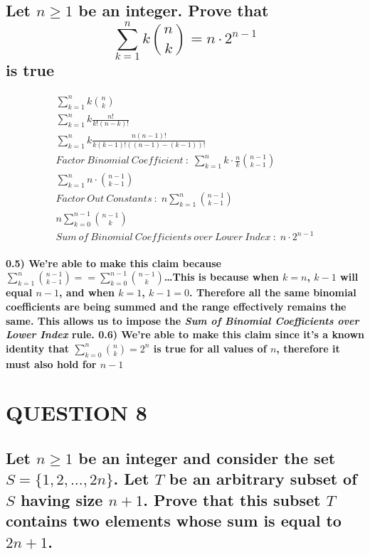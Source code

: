 \documentclass{amsart}
\theoremstyle{definition}
\theoremstyle{remark}
\numberwithin{equation}{section}
\begin{document}
\subsection*{
Let $n \geq 1$ be an integer. Prove that 
\[ \sum_{k=1}^n k {n \choose k} = n \cdot 2^{n-1} \] is true
}
\begin{align}
	\sum_{k=1}^n k {n \choose k} \\
	\sum_{k=1}^n k\frac{n!}{k!(n-k)!} \\
	\sum_{k=1}^n k \frac{n(n-1)!}{k(k-1)!( (n-1) - (k-1) )!} \\
	Factor\:Binomial\:Coefficient\: :\; \sum_{k=1}^n k\cdot \frac{n}{k}{n-1 \choose k-1} \\
	\sum_{k=1}^n n\cdot {n-1 \choose k-1} \\
	Factor\:Out\:Constants\: :\; n \sum_{k=1}^n {n-1 \choose k-1} \\
	n \sum_{k=0}^{n-1} {n-1 \choose k} \\
	Sum\:of\:Binomial\:Coefficients\:over\:Lower\:Index\: :\;n\cdot 2^{n-1}
\end{align}
\paragraph{
	\textbf{0.5)} We're able to make this claim because $\sum_{k=1}^n {n-1 \choose k-1} == \sum_{k=0}^{n-1} {n-1 \choose k}$\dots\newline This is because when $k=n$, $k-1$ will equal $n-1$, and when $k=1$, $k-1 = 0$. Therefore all the same binomial coefficients are being summed and the range effectively remains the same. This allows us to impose the \textit{Sum of Binomial Coefficients over Lower Index} rule.\newline\newline
	\textbf{0.6)} We're able to make this claim since it's a known identity that $\sum_{k=0}^{n} {n \choose k} = 2^n$ is true for all values of $n$, therefore it must also hold for $n-1$
}
\setcounter{equation}{0}

\section*{QUESTION 8}
\subsection*{
Let $n \geq 1$ be an integer and consider the set $S = \{1,2,\ldots,2n\}$. 
Let $T$ be an arbitrary subset of $S$ having size $n+1$. Prove that this 
subset $T$ contains two elements whose sum is equal to $2n+1$.}
\end{document}
